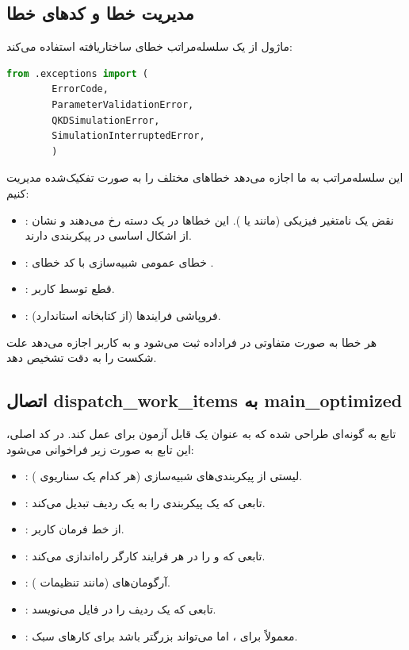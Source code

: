 \subsection{مدیریت خطا و کدهای خطا}

ماژول از یک سلسله‌مراتب خطای ساختاریافته استفاده می‌کند:

\begin{LTR}
	\begin{lstlisting}[language=Python]
		from .exceptions import (
		ErrorCode,
		ParameterValidationError,
		QKDSimulationError,
		SimulationInterruptedError,
		)
	\end{lstlisting}
\end{LTR}

\noindent این سلسله‌مراتب به ما اجازه می‌دهد خطاهای مختلف را به صورت تفکیک‌شده مدیریت کنیم:

\begin{itemize}
	\item {}: نقض یک نامتغیر فیزیکی (مانند  یا ). این خطاها در یک دسته رخ می‌دهند و نشان از اشکال اساسی در پیکربندی دارند.
	\item {}: خطای عمومی شبیه‌سازی با کد خطای .
	\item {}: قطع توسط کاربر.
	\item {}: فروپاشی  فرایندها (از کتابخانه استاندارد).
\end{itemize}

هر خطا به صورت متفاوتی در فراداده ثبت می‌شود و به کاربر اجازه می‌دهد علت شکست را به دقت تشخیص دهد.

\subsection{اتصال dispatch\_work\_items به main\_optimized}

تابع  به گونه‌ای طراحی شده که به عنوان یک  قابل آزمون برای  عمل کند. در کد اصلی، این تابع به صورت زیر فراخوانی می‌شود:

\begin{itemize}
	\item {}: لیستی از پیکربندی‌های شبیه‌سازی (هر کدام یک سناریوی ).
	\item {}: تابعی که یک پیکربندی را به یک ردیف  تبدیل می‌کند.
	\item {}: از خط فرمان کاربر.
	\item {}: تابعی که  و  را در هر فرایند کارگر راه‌اندازی می‌کند.
	\item {}: آرگومان‌های  (مانند تنظیمات ).
	\item {}: تابعی که یک ردیف را در فایل  می‌نویسد.
	\item {}: معمولاً  برای ، اما می‌تواند بزرگتر باشد برای کارهای سبک.
\end{itemize}

